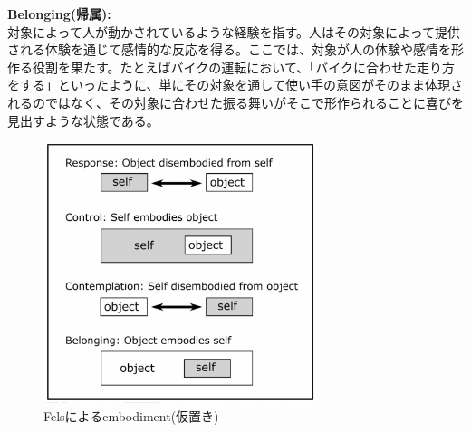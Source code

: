 \textbf{Belonging(帰属):}\\
対象によって人が動かされているような経験を指す。人はその対象によって提供される体験を通じて感情的な反応を得る。ここでは、対象が人の体験や感情を形作る役割を果たす。たとえばバイクの運転において、「バイクに合わせた走り方をする」といったように、単にその対象を通して使い手の意図がそのまま体現されるのではなく、その対象に合わせた振る舞いがそこで形作られることに喜びを見出すような状態である。

\begin{figure}[H]
  \centering
  \includegraphics[width=8cm]{img/fels_diagram.png}
  \caption{Felsによるembodiment(仮置き)}
  \label{fig:fels_embodiment}
\end{figure}



